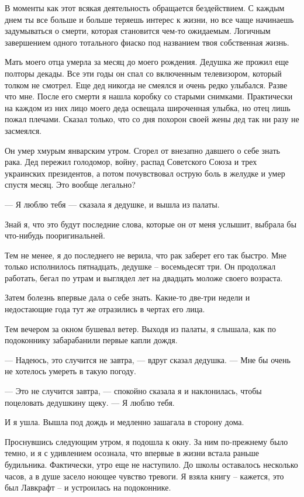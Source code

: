 \documentclass[
]{book}
\begin{document}
В моменты как этот всякая деятельность обращается бездействием. С каждым днем ты все больше и больше теряешь интерес к жизни, но все чаще начинаешь задумываться о смерти, которая становится чем-то ожидаемым. Логичным завершением одного тотального фиаско под названием твоя собственная жизнь.

Мать моего отца умерла за месяц до моего рождения. Дедушка же прожил еще полторы декады. Все эти годы он спал со включенным телевизором, который толком не смотрел. Еще дед никогда не смеялся и очень редко улыбался. Разве что мне. После его смерти я нашла коробку со старыми снимками. Практически на каждом из них лицо моего деда освещала широченная улыбка, но отец лишь пожал плечами. Сказал только, что со дня похорон своей жены дед так ни разу не засмеялся.

Он умер хмурым январским утром. Сгорел от внезапно давшего о себе знать рака. Дед пережил голодомор, войну, распад Советского Союза и трех украинских президентов, а потом почувствовал острую боль в желудке и умер спустя месяц. Это вообще легально?

--- Я люблю тебя --- сказала я дедушке, и вышла из палаты.

Знай я, что это будут последние слова, которые он от меня услышит, выбрала бы что-нибудь пооригинальней.

Тем не менее, я до последнего не верила, что рак заберет его так быстро. Мне только исполнилось пятнадцать, дедушке -- восемьдесят три. Он продолжал работать, бегал по утрам и выглядел лет на двадцать моложе своего возраста.

Затем болезнь впервые дала о себе знать. Какие-то две-три недели и недостающие года тут же отразились в чертах его лица.

Тем вечером за окном бушевал ветер. Выходя из палаты, я слышала, как по подоконнику забарабанили первые капли дождя.

--- Надеюсь, это случится не завтра, --- вдруг сказал дедушка. --- Мне бы очень не хотелось умереть в такую погоду.

--- Это не случится завтра, --- спокойно сказала я и наклонилась, чтобы поцеловать дедушкину щеку. --- Я люблю тебя.

И я ушла. Вышла под дождь и медленно зашагала в сторону дома.

Проснувшись следующим утром, я подошла к окну. За ним по-прежнему было темно, и я с удивлением осознала, что впервые в жизни встала раньше будильника. Фактически, утро еще не наступило. До школы оставалось несколько часов, а в душе засело ноющее чувство тревоги. Я взяла книгу -- кажется, это был Лавкрафт -- и устроилась на подоконнике.
\end{document}
